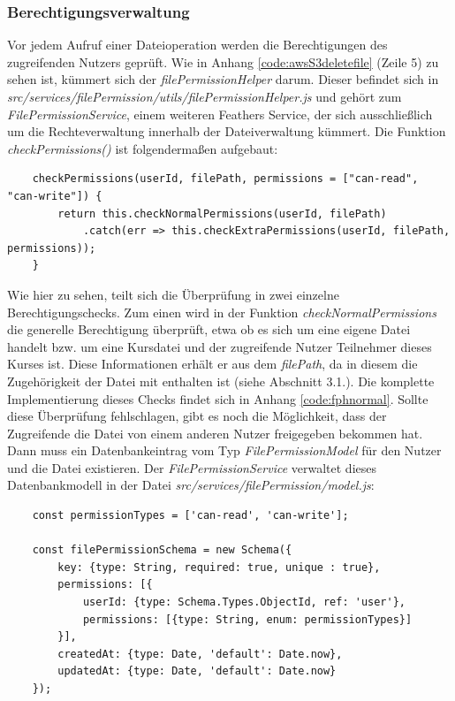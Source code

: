 \subsubsection{Berechtigungsverwaltung}

Vor jedem Aufruf einer Dateioperation werden die Berechtigungen des zugreifenden Nutzers geprüft. Wie in Anhang \ref{code:awsS3deletefile} (Zeile 5) zu sehen ist, kümmert sich der \textit{filePermissionHelper} darum. Dieser befindet sich in \textit{src/services/filePermission/utils/filePermissionHelper.js} und gehört zum \textit{FilePermissionService}, einem weiteren Feathers Service, der sich ausschließlich um die Rechteverwaltung innerhalb der Dateiverwaltung kümmert. Die Funktion \textit{checkPermissions()} ist folgendermaßen aufgebaut:

\begin{lstlisting}
	checkPermissions(userId, filePath, permissions = ["can-read", "can-write"]) {
		return this.checkNormalPermissions(userId, filePath)
			.catch(err => this.checkExtraPermissions(userId, filePath, permissions));
	}
\end{lstlisting}

Wie hier zu sehen, teilt sich die Überprüfung in zwei einzelne Berechtigungschecks. Zum einen wird in der Funktion \textit{checkNormalPermissions} die generelle Berechtigung überprüft, etwa ob es sich um eine eigene Datei handelt bzw. um eine Kursdatei und der zugreifende Nutzer Teilnehmer dieses Kurses ist. Diese Informationen erhält er aus dem \textit{filePath}, da in diesem die Zugehörigkeit der Datei mit enthalten ist (siehe Abschnitt 3.1.). Die komplette Implementierung dieses Checks findet sich in Anhang \ref{code:fphnormal}. Sollte diese Überprüfung fehlschlagen, gibt es noch die Möglichkeit, dass der Zugreifende die Datei von einem anderen Nutzer freigegeben bekommen hat. Dann muss ein Datenbankeintrag vom Typ \textit{FilePermissionModel} für den Nutzer und die Datei existieren. Der \textit{FilePermissionService} verwaltet dieses Datenbankmodell in der Datei \textit{src/services/filePermission/model.js}:

\begin{lstlisting}
	const permissionTypes = ['can-read', 'can-write'];
	
	const filePermissionSchema = new Schema({
		key: {type: String, required: true, unique : true},
		permissions: [{
			userId: {type: Schema.Types.ObjectId, ref: 'user'},
			permissions: [{type: String, enum: permissionTypes}]
		}],
		createdAt: {type: Date, 'default': Date.now},
		updatedAt: {type: Date, 'default': Date.now}
	});
\end{lstlisting}

